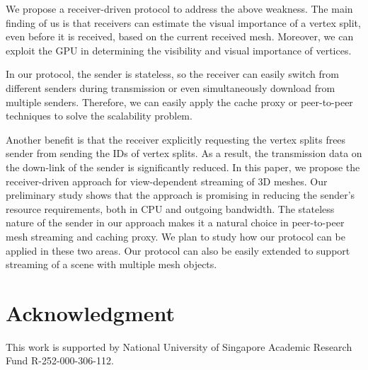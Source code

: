 We propose a receiver-driven protocol to address the above weakness.
The main finding of us is that %
receivers can estimate the visual importance of a vertex split, even before
it is received, based on the current received mesh. Moreover, we can exploit the GPU
in determining the visibility and visual importance of vertices.

In our protocol, the sender is stateless,  so the receiver can easily
switch from different senders during transmission or even simultaneously
download from multiple senders. Therefore, we can easily apply
the cache proxy or peer-to-peer techniques to solve the scalability problem. 

Another benefit is that the receiver explicitly requesting the vertex splits
frees sender from sending the IDs of vertex splits. As a result, the
transmission data on the down-link of the sender is significantly reduced. 
\fi
In this paper, we propose the receiver-driven approach for view-dependent 
streaming of 3D meshes.  Our preliminary study shows that the approach
is promising in reducing the sender's resource requirements, both in CPU and
outgoing bandwidth.  The stateless nature of the sender in our approach makes
it a natural choice in peer-to-peer mesh streaming and caching proxy.
We plan to study how our protocol can be applied in these two areas.  Our
protocol can also be easily extended to support streaming of a scene with
multiple mesh objects.
\section*{Acknowledgment}
This work is supported by National University of Singapore Academic Research Fund R-252-000-306-112.
